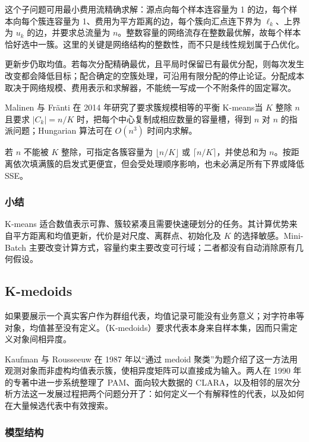 这个子问题可用最小费用流精确求解：源点向每个样本连容量为 1 的边，每个样本向每个簇连容量为 1、费用为平方距离的边，每个簇向汇点连下界为 $\ell_k$、上界为 $u_k$ 的边，并要求总流量为 $n$。整数容量的网络流存在整数最优解，故每个样本恰好选中一簇。这里的关键是网络结构的整数性，而不只是线性规划属于凸优化。

更新步仍取均值。若每次分配精确最优，且平局时保留已有最优分配，则每次发生改变都会降低目标；配合确定的空簇处理，可沿用有限分配的停止论证。分配成本取决于网络规模、费用表示和求解器，不能统一写成一个不附条件的固定幂次。

Malinen 与 Fränti 在 2014 年研究了要求簇规模相等的平衡 K-means当 $K$ 整除 $n$ 且要求 $|C_k|=n/K$ 时，把每个中心复制成相应数量的容量槽，得到 $n$ 对 $n$ 的指派问题；Hungarian 算法可在 $O(n^3)$ 时间内求解。

若 $n$ 不能被 $K$ 整除，可指定各簇容量为 $\lfloor n/K\rfloor$ 或 $\lceil n/K\rceil$，并使总和为 $n$。按距离依次填满簇的启发式更便宜，但会受处理顺序影响，也未必满足所有下界或降低 SSE。

\subsubsection{小结}

K-means 适合数值表示可靠、簇较紧凑且需要快速硬划分的任务。其计算优势来自平方距离和均值更新，代价是对尺度、离群点、初始化及 $K$ 的选择敏感。Mini-Batch 主要改变计算方式，容量约束主要改变可行域；二者都没有自动消除原有几何假设。

\subsection{K-medoids}
\label{sec:clustering-kmedoids}

如果要展示一个真实客户作为群组代表，均值记录可能没有业务意义；对字符串等对象，均值甚至没有定义。（K-medoids）要求代表本身来自样本集，因而只需定义对象间相异度。

Kaufman 与 Rousseeuw 在 1987 年以“通过 medoid 聚类”为题介绍了这一方法用观测对象而非虚构均值表示簇，使相异度矩阵可以直接成为输入。两人在 1990 年的专著中进一步系统整理了 PAM、面向较大数据的 CLARA，以及相邻的层次分析方法这一发展过程把两个问题分开了：如何定义一个有解释性的代表，以及如何在大量候选代表中有效搜索。

\subsubsection{模型结构}


